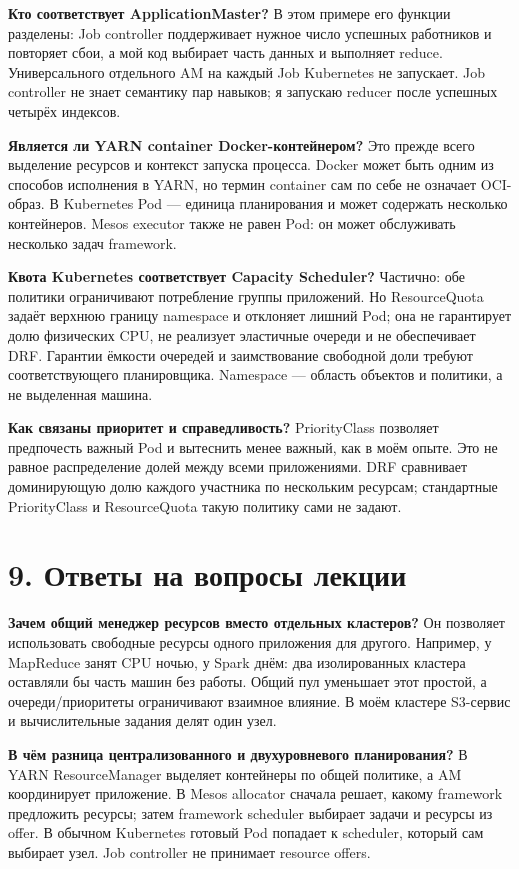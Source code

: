 \documentclass[10pt,a4paper]{article}
\begin{document}
\textbf{Кто соответствует ApplicationMaster?}
В этом примере его функции разделены: Job controller поддерживает нужное
число успешных работников и повторяет сбои, а мой код выбирает часть
данных и выполняет reduce. Универсального отдельного AM на каждый Job
Kubernetes не запускает. Job controller не знает семантику пар навыков;
я запускаю reducer после успешных четырёх индексов.

\textbf{Является ли YARN container Docker-контейнером?}
Это прежде всего выделение ресурсов и контекст запуска процесса.
Docker может быть одним из способов исполнения в YARN, но термин
container сам по себе не означает OCI-образ. В Kubernetes Pod --- единица
планирования и может содержать несколько контейнеров. Mesos executor
также не равен Pod: он может обслуживать несколько задач framework.

\textbf{Квота Kubernetes соответствует Capacity Scheduler?}
Частично: обе политики ограничивают потребление группы приложений.
Но ResourceQuota задаёт верхнюю границу namespace и отклоняет лишний Pod;
она не гарантирует долю физических CPU, не реализует эластичные очереди
и не обеспечивает DRF. Гарантии ёмкости очередей и заимствование свободной
доли требуют соответствующего планировщика. Namespace --- область
объектов и политики, а не выделенная машина.

\textbf{Как связаны приоритет и справедливость?}
PriorityClass позволяет предпочесть важный Pod и вытеснить менее важный,
как в моём опыте. Это не равное распределение долей между всеми
приложениями. DRF сравнивает доминирующую долю каждого участника по
нескольким ресурсам; стандартные PriorityClass и ResourceQuota такую
политику сами не задают.

\clearpage
\section*{9. Ответы на вопросы лекции}
\textbf{Зачем общий менеджер ресурсов вместо отдельных кластеров?}
Он позволяет использовать свободные ресурсы одного приложения для
другого. Например, у MapReduce занят CPU ночью, у Spark днём: два
изолированных кластера оставляли бы часть машин без работы. Общий пул
уменьшает этот простой, а очереди/приоритеты ограничивают взаимное влияние.
В моём кластере S3-сервис и вычислительные задания делят один узел.

\textbf{В чём разница централизованного и двухуровневого планирования?}
В YARN ResourceManager выделяет контейнеры по общей политике, а AM
координирует приложение. В Mesos allocator сначала решает, какому framework
предложить ресурсы; затем framework scheduler выбирает задачи и ресурсы
из offer. В обычном Kubernetes готовый Pod попадает к scheduler, который
сам выбирает узел. Job controller не принимает resource offers.
\end{document}
